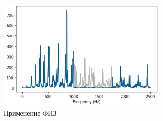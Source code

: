 \documentclass[a4paper, 12pt]{report}
\begin{document}
	\begin{figure}[H]
		\centering
		\includegraphics[width=0.75\textwidth]{filter3.png}
		\caption{Применение ФПЗ}
		\label{fig:filter3}
	\end{figure}
\end{document}
